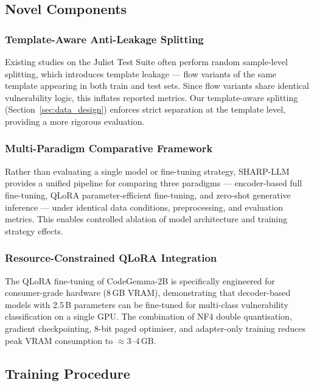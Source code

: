 \subsection{Novel Components}
\label{sec:novel}

\subsubsection{Template-Aware Anti-Leakage Splitting}
Existing studies on the Juliet Test Suite often perform random sample-level
splitting, which introduces template leakage --- flow variants of the same
template appearing in both train and test sets.  Since flow variants share
identical vulnerability logic, this inflates reported metrics.  Our
template-aware splitting (Section~\ref{sec:data_design}) enforces strict
separation at the template level, providing a more rigorous evaluation.

\subsubsection{Multi-Paradigm Comparative Framework}
Rather than evaluating a single model or fine-tuning strategy, SHARP-LLM
provides a unified pipeline for comparing three paradigms ---
encoder-based full fine-tuning, QLoRA parameter-efficient fine-tuning, and
zero-shot generative inference --- under identical data conditions,
preprocessing, and evaluation metrics.  This enables controlled ablation
of model architecture and training strategy effects.

\subsubsection{Resource-Constrained QLoRA Integration}
The QLoRA fine-tuning of CodeGemma-2B is specifically engineered for
consumer-grade hardware (8\,GB VRAM), demonstrating that decoder-based
models with 2.5\,B parameters can be fine-tuned for multi-class
vulnerability classification on a single GPU.  The combination of NF4
double quantisation, gradient checkpointing, 8-bit paged optimiser, and
adapter-only training reduces peak VRAM consumption to
$\approx\!3$--$4$\,GB.

\subsection{Training Procedure}
\label{sec:training}

